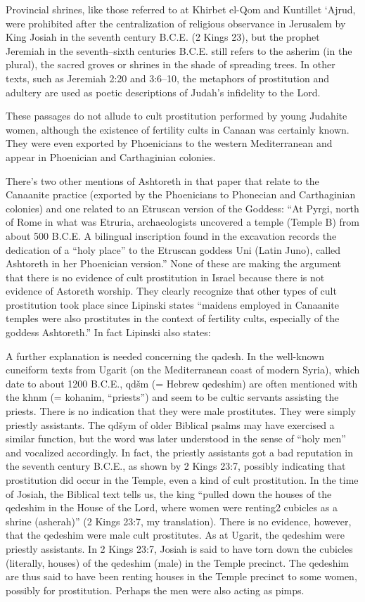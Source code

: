 \documentclass[11pt]{article}
\begin{document}
Provincial shrines, like those referred to at Khirbet el-Qom and Kuntillet ‘Ajrud, were prohibited after the centralization of religious observance in Jerusalem by King Josiah in the seventh century B.C.E. (2 Kings 23), but the prophet Jeremiah in the seventh–sixth centuries B.C.E. still refers to the asherim (in the plural), the sacred groves or shrines in the shade of spreading trees. In other texts, such as Jeremiah 2:20 and 3:6–10, the metaphors of prostitution and adultery are used as poetic descriptions of Judah’s infidelity to the Lord.

These passages do not allude to cult prostitution performed by young Judahite women, although the existence of fertility cults in Canaan was certainly known. They were even exported by Phoenicians to the western Mediterranean and appear in Phoenician and Carthaginian colonies.

There’s two other mentions of Ashtoreth in that paper that relate to the Canaanite practice (exported by the Phoenicians to Phonecian and Carthaginian colonies) and one related to an Etruscan version of the Goddess: 
“At Pyrgi, north of Rome in what was Etruria, archaeologists uncovered a temple (Temple B) from about 500 B.C.E. A bilingual inscription found in the excavation records the dedication of a “holy place” to the Etruscan goddess Uni (Latin Juno), called Ashtoreth in her Phoenician version.”
None of these are making the argument that there is no evidence of cult prostitution in Israel because there is not evidence of Astoreth worship. They clearly recognize that other types of cult prostitution took place since Lipinski states “maidens employed in Canaanite temples were also prostitutes in the context of fertility cults, especially of the goddess Ashtoreth.” In fact Lipinski also states:

A further explanation is needed concerning the qadesh. In the well-known cuneiform texts from Ugarit (on the Mediterranean coast of modern Syria), which date to about 1200 B.C.E., qdšm (= Hebrew qedeshim) are often mentioned with the khnm (= kohanim, “priests”) and seem to be cultic servants assisting the priests. There is no indication that they were male prostitutes. They were simply priestly assistants. The qdšym of older Biblical psalms may have exercised a similar function, but the word was later understood in the sense of “holy men” and vocalized accordingly. In fact, the priestly assistants got a bad reputation in the seventh century B.C.E., as shown by 2 Kings 23:7, possibly indicating that prostitution did occur in the Temple, even a kind of cult prostitution. In the time of Josiah, the Biblical text tells us, the king “pulled down the houses of the qedeshim in the House of the Lord, where women were renting2 cubicles as a shrine (asherah)” (2 Kings 23:7, my translation). There is no evidence, however, that the qedeshim were male cult prostitutes. As at Ugarit, the qedeshim were priestly assistants. In 2 Kings 23:7, Josiah is said to have torn down the cubicles (literally, houses) of the qedeshim (male) in the Temple precinct. The qedeshim are thus said to have been renting houses in the Temple precinct to some women, possibly for prostitution. Perhaps the men were also acting as pimps.
\end{document}
